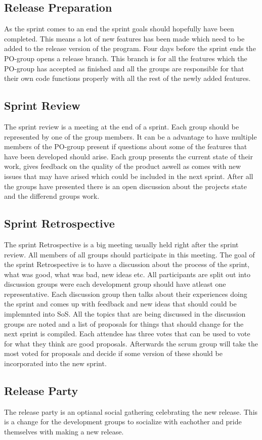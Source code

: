 \subsection{Release Preparation}
As the sprint comes to an end the sprint goals should hopefully have been completed.
This means a lot of new features has been made which need to be added to the release version of the program.
Four days before the sprint ends the PO-group opens a release branch.
This branch is for all the features which the PO-group has accepted as finished and all the groups are responsible for that their own code functions properly with all the rest of the newly added features.


\subsection{Sprint Review}
The sprint review is a meeting at the end of a sprint. 
Each group should be represented by one of the group members. 
It can be a advantage to have multiple members of the PO-group present if questions about some of the features that have been developed should arise.
Each group presents the current state of their work, gives feedback on the quality of the product aswell as comes with new issues that may have arised which could be included in the next sprint.
After all the groups have presented there is an open discussion about the projects state and the differend groups work.

\subsection{Sprint Retrospective}
The sprint Retrospective is a big meeting usually held right after the sprint review.
All members of all groups should participate in this meeting.
The goal of the sprint Retrospective is to have a discussion about the process of the sprint, what was good, what was bad, new ideas etc.
All participants are split out into discussion groups were each development group should have atleast one representative.
\newline
\newline
Each discussion group then talks about their experiences doing the sprint and comes up with feedback and new ideas that should could be implemnted into SoS.
All the topics that are being discussed in the discussion groups are noted and a list of proposals for things that should change for the next sprint is compiled.
Each attendee has three votes that can be used to vote for what they think are good proposals.
Afterwards the scrum group will take the most voted for proposals and decide if some version of these should be incorporated into the new sprint.

\subsection{Release Party}
The release party is an optianal social gathering celebrating the new release. 
This is a change for the development groups to socialize with eachother and pride themselves with making a new release.


